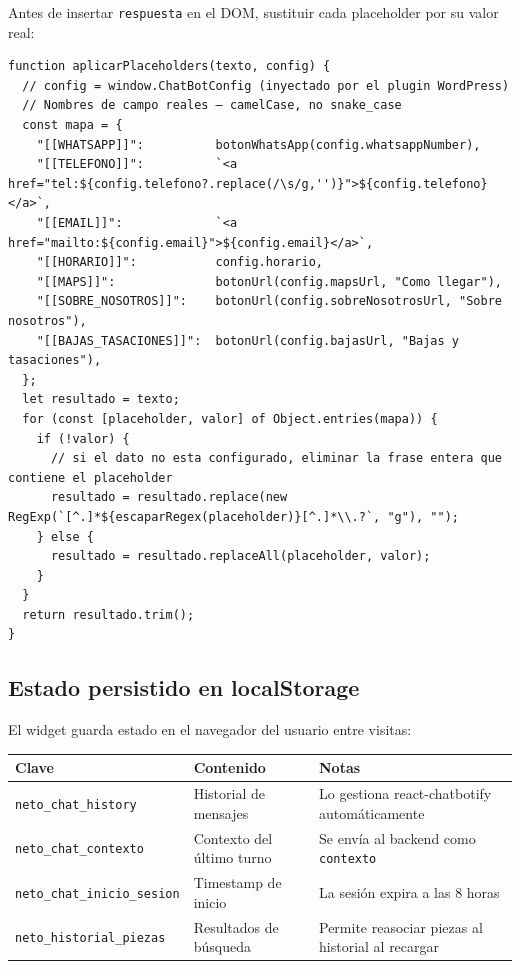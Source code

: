 \documentclass[12pt, a4paper]{article}
\begin{document}
Antes de insertar \texttt{respuesta} en el DOM, sustituir cada placeholder por su valor real:

\begin{lstlisting}[style=js, caption={Función de sustitución de placeholders}]
function aplicarPlaceholders(texto, config) {
  // config = window.ChatBotConfig (inyectado por el plugin WordPress)
  // Nombres de campo reales — camelCase, no snake_case
  const mapa = {
    "[[WHATSAPP]]":          botonWhatsApp(config.whatsappNumber),
    "[[TELEFONO]]":          `<a href="tel:${config.telefono?.replace(/\s/g,'')}">${config.telefono}</a>`,
    "[[EMAIL]]":             `<a href="mailto:${config.email}">${config.email}</a>`,
    "[[HORARIO]]":           config.horario,
    "[[MAPS]]":              botonUrl(config.mapsUrl, "Como llegar"),
    "[[SOBRE_NOSOTROS]]":    botonUrl(config.sobreNosotrosUrl, "Sobre nosotros"),
    "[[BAJAS_TASACIONES]]":  botonUrl(config.bajasUrl, "Bajas y tasaciones"),
  };
  let resultado = texto;
  for (const [placeholder, valor] of Object.entries(mapa)) {
    if (!valor) {
      // si el dato no esta configurado, eliminar la frase entera que contiene el placeholder
      resultado = resultado.replace(new RegExp(`[^.]*${escaparRegex(placeholder)}[^.]*\\.?`, "g"), "");
    } else {
      resultado = resultado.replaceAll(placeholder, valor);
    }
  }
  return resultado.trim();
}
\end{lstlisting}

\subsection{Estado persistido en localStorage}

El widget guarda estado en el navegador del usuario entre visitas:

\begin{center}
\renewcommand{\arraystretch}{1.25}
\begin{tabularx}{\textwidth}{llX}
\toprule
\textbf{Clave} & \textbf{Contenido} & \textbf{Notas} \\
\midrule
\texttt{neto\_chat\_history}        & Historial de mensajes    & Lo gestiona react-chatbotify automáticamente \\
\texttt{neto\_chat\_contexto}       & Contexto del último turno & Se envía al backend como \texttt{contexto} \\
\texttt{neto\_chat\_inicio\_sesion} & Timestamp de inicio       & La sesión expira a las 8 horas \\
\texttt{neto\_historial\_piezas}    & Resultados de búsqueda    & Permite reasociar piezas al historial al recargar \\
\bottomrule
\end{tabularx}
\end{center}
\end{document}
